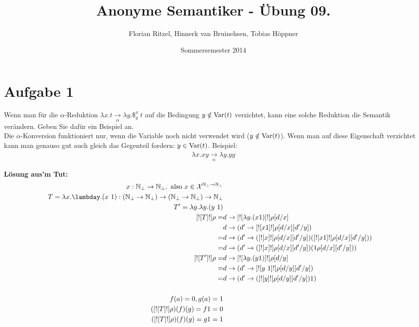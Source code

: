 \documentclass[ngerman,a4paper]{report}
\author{Florian Ritzel, Hinnerk van Bruinehsen, Tobias Höppner}
\title{Anonyme Semantiker - Übung 09. }
\date{Sommersemester 2014}
\renewcommand{\maketitle}{}
\begin{document}
\maketitle
\section*{Aufgabe 1}
Wenn man für die $\alpha$-Reduktion $\lambda x.t \xrightarrow[\alpha]{} \lambda y.\$_y^x\ t$ auf die Bedingung $y \notin \text{\lstinline!Var!}(t)$ verzichtet, kann eine solche Reduktion die Semantik verändern. Geben Sie dafür ein Beispiel an.\\

Die $\alpha$-Konversion funktioniert nur, wenn die Variable noch nicht verwendet wird ($y \notin \text{\lstinline!Var!}(t)$). Wenn man auf diese Eigenschaft verzichtet kann man genauso gut auch gleich das Gegenteil fordern: $y \in \text{\lstinline!Var!}(t)$. Beispiel:
\begin{align*}
\lambda x.xy \xrightarrow[\alpha]{}\lambda y.yy
\end{align*}

\textbf{Lösung aus'm Tut:}
\begin{align*}
x : \mathbb{N}_\perp \rightarrow \mathbb{N}_\perp, \text{ also } x \in \mathcal{X}^{\mathbb{N}_\perp \rightarrow \mathbb{N}_\perp}\\
T = \lambda x.\lambday.(x\ 1) : (\mathbb{N}_\perp \rightarrow \mathbb{N}_\perp) \rightarrow (\mathbb{N}_\perp \rightarrow \mathbb{N}_\perp) \rightarrow \mathbb{N}_\perp\\
T' = \lambda y . \lambda y . (y \ 1)\\
[![ T ]!] \rho = &d \rightarrow [![ \lambda y . (x 1) ]!] \rho [d/x]\\
&d \rightarrow (d' \rightarrow [![ x 1 ]!] \rho [d/x][d'/y])\\
=&d \rightarrow (d' \rightarrow ([![ x ]!] \rho [d/x][d'/y])( [![ x 1 ]!] \rho [d/x][d'/y]))\\
=&d \rightarrow (d' \rightarrow ([![ x ]!] \rho [d/x][d'/y])( 1 \rho [d/x][d'/y]))\\
[![ T' ]!] \rho = & d \rightarrow [![ \lambda y . (y 1) ]!] \rho [d/y]\\
= & d \rightarrow (d' \rightarrow [![ y \ 1 ]!] \rho [d/y][d'/y])\\
= & d \rightarrow (d' \rightarrow ([![ y ]!] \rho [d/y] [d'/y]) 1 )\\
\\
f(a) = 0, g(a) = 1\\
([![ T ]!] \rho) (f) (g) = f 1 = 0\\
([![ T ]!] \rho) (f) (g) = g 1 = 1\\
\end{align*}
\end{document}

